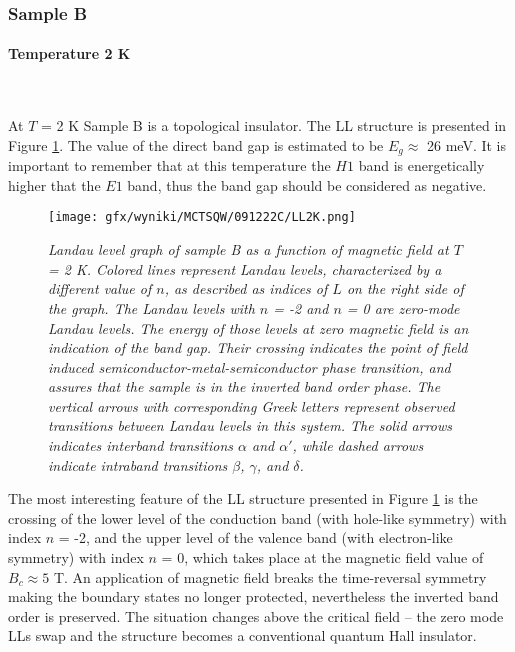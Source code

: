 \documentclass[titlepage,a4paper]{book}
\newcommand{\wciecie}{\quad\phantom{v}}
\newcommand{\myparagraph}[1]{\paragraph{#1}\mbox{}\\}
\begin{document}
\clearpage
\subsubsection{Sample B}
\myparagraph{Temperature 2 K}
\wciecie

At $T$ = 2 K Sample B is a topological insulator. The LL structure is presented in Figure \ref{fig:LL_SQW_2K}. The value of the direct band gap is estimated to be $E_g \approx $ 26 meV. It is important to remember that at this temperature the $H1$ band is energetically higher that the $E1$ band, thus the band gap should be considered as negative.

\begin{figure}[ht]
	\centering
	\texttt{[image: gfx/wyniki/MCTSQW/091222C/LL2K.png]}
	\vspace{-10pt}
	\caption{\textit{Landau level graph of sample B as a function of magnetic field at $T$ = 2 K. Colored lines represent Landau levels, characterized by a different value of $n$, as described as indices of $L$ on the right side of the graph. The Landau levels with $n$ = -2 and $n$ = 0 are zero-mode Landau levels. The energy of those levels at zero magnetic field is an indication of the band gap. Their crossing indicates the point of field induced semiconductor-metal-semiconductor phase transition, and assures that the sample is in the inverted band order phase. The vertical arrows with corresponding Greek letters represent observed transitions between Landau levels in this system. The solid arrows indicates interband transitions $\alpha$ and $\alpha'$, while dashed arrows indicate intraband transitions $\beta$, $\gamma$, and $\delta$.}}
	\label{fig:LL_SQW_2K}
\end{figure}

The most interesting feature of the LL structure presented in Figure \ref{fig:LL_SQW_2K} is the crossing of the lower level of the conduction band (with hole-like symmetry) with index $n$ = -2, and the upper level of the valence band (with electron-like symmetry) with index $n$ = 0, which takes place at the magnetic field value of $B_c \approx 5$ T. An application of magnetic field breaks the time-reversal symmetry making the boundary states no longer protected, nevertheless the inverted band order is preserved. The situation changes above the critical field -- the zero mode LLs swap and the structure becomes a conventional quantum Hall insulator. 
 
\end{document}
